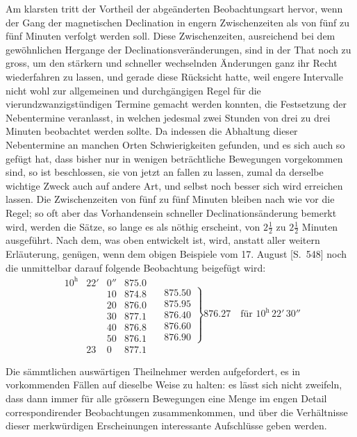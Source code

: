 Am klarsten tritt der Vortheil der abgeänderten Beobachtungsart hervor, wenn der Gang der magnetischen Declination in engern Zwischenzeiten als von fünf zu fünf Minuten verfolgt werden soll. Diese Zwischenzeiten, ausreichend bei dem gewöhnlichen Hergange der Declinationsveränderungen, sind in der That noch zu gross, um den stärkern und schneller wechselnden Änderungen ganz ihr Recht wiederfahren zu lassen, und gerade diese Rücksicht hatte, weil engere Intervalle nicht wohl zur allgemeinen und durchgängigen Regel für die vierundzwanzigstündigen Termine gemacht werden konnten, die Festsetzung der Nebentermine veranlasst, in welchen jedesmal zwei Stunden von drei zu drei Minuten beobachtet werden sollte. Da indessen die Abhaltung dieser Nebentermine an manchen Orten Schwierigkeiten gefunden, und es sich auch so gefügt hat, dass bisher nur in wenigen beträchtliche Bewegungen vorgekommen sind, so ist beschlossen, sie von jetzt an fallen zu lassen, zumal da derselbe wichtige Zweck auch auf andere Art, und selbst noch besser sich wird erreichen lassen. Die Zwischenzeiten von fünf zu fünf Minuten bleiben nach wie vor die Regel; so oft aber das Vorhandensein schneller Declinationsänderung bemerkt wird, werden die Sätze, so lange es als nöthig erscheint, von $2\frac12$ zu $2\frac12$ Minuten ausgeführt. Nach dem, was oben entwickelt ist, wird, anstatt aller weitern Erläuterung, genügen, wenn dem obigen Beispiele vom 17. August [S.\ 548] noch die unmittelbar darauf folgende Beobachtung beigefügt wird:
\[
\begin{array}{rrr|r|}
10^{\mathrm h}&22'&0''&875.0\\
&&10&874.8\\
&&20&876.0\\
&&30&877.1\\
&&40&876.8\\
&&50&876.1\\
&23&0&877.1
\end{array}\quad
\left.\begin{array}{r}875.50\\875.95\\876.40\\876.60\\876.90\end{array}\right\}876.27\quad\text{für }10^{\mathrm h}\,22'\,30''
\]

Die sämmtlichen auswärtigen Theilnehmer werden aufgefordert, es in vorkommenden Fällen auf dieselbe Weise zu halten: es lässt sich nicht zweifeln, dass dann immer für alle grössern Bewegungen eine Menge im engen Detail correspondirender Beobachtungen zusammenkommen, und über die Verhältnisse dieser merkwürdigen Erscheinungen interessante Aufschlüsse geben werden.

